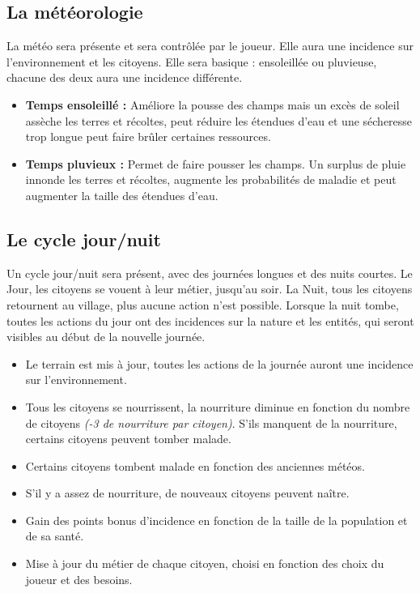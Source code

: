 \documentclass[a4paper]{memoir}
\begin{document}
			\subsection{La météorologie}
				La météo sera présente et sera contrôlée par le joueur. Elle aura une incidence sur l'environnement et les citoyens. Elle sera basique : ensoleillée ou pluvieuse, chacune des deux aura une incidence différente. 
				\begin{itemize}[label=$\bullet$]
					\item \textbf{Temps ensoleillé :} Améliore la pousse des champs mais un excès de soleil assèche les terres et récoltes, peut réduire les étendues d'eau et une sécheresse trop longue peut faire brûler certaines ressources.
					\item \textbf{Temps pluvieux :} Permet de faire pousser les champs. Un surplus de pluie innonde les terres et récoltes, augmente les probabilités de maladie et peut augmenter la taille des étendues d'eau.
				\end{itemize}


			\subsection{Le cycle jour/nuit}
				\label{Cycle}
				Un cycle jour/nuit sera présent, avec des journées longues et des nuits courtes. Le Jour, les citoyens se vouent à leur métier, jusqu'au soir. La Nuit, tous les citoyens retournent au village, plus aucune action n'est possible. Lorsque la nuit tombe, toutes les actions du jour ont des incidences sur la nature et les entités, qui seront visibles au début de la nouvelle journée.
				\begin{itemize}[label=$\bullet$]
					\item Le terrain est mis à jour, toutes les actions de la journée auront une incidence sur l'environnement.
					\item Tous les citoyens se nourrissent, la nourriture diminue en fonction du nombre de citoyens \textit{(-3 de nourriture par citoyen)}. S'ils manquent de la nourriture, certains citoyens peuvent tomber malade.
					\item Certains citoyens tombent malade en fonction des anciennes météos.
					\item S'il y a assez de nourriture, de nouveaux citoyens peuvent naître.
					\item Gain des points bonus d'incidence en fonction de la taille de la population et de sa santé.
					\item Mise à jour du métier de chaque citoyen, choisi en fonction des choix du joueur et des besoins.
				\end{itemize}
\end{document}
